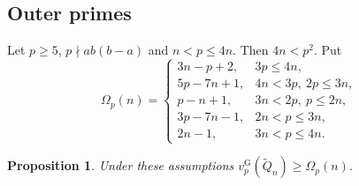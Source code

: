 \documentclass[11pt]{amsart}
\newtheorem{proposition}[theorem]{Proposition}
\theoremstyle{definition}
\theoremstyle{remark}
\numberwithin{equation}{section}
\newcommand{\vG}{v_p^{\mathrm G}}
\begin{document}
\subsection{Outer primes}\label{tp:ssec:outer}
Let $p\ge5$, $p\nmid ab(b-a)$ and $n<p\le4n$. Then $4n<p^2$. Put
\[
 \Omega_p(n)=\begin{cases}
 3n-p+2,& 3p\le4n,\\
 5p-7n+1,& 4n<3p,\ 2p\le3n,\\
 p-n+1,& 3n<2p,\ p\le2n,\\
 3p-7n-1,& 2n<p\le3n,\\
 2n-1,& 3n<p\le4n.
 \end{cases}
\]

\begin{proposition}\label{tp:prop:outer}
Under these assumptions $\vG(\tilde Q_n)\ge \Omega_p(n)$.
\end{proposition}
\end{document}
